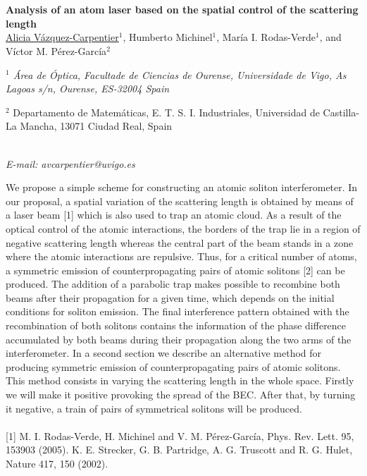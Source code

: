 \section*{}
\begin{center}
{\bf \Large
Analysis of an atom laser based on the spatial control of the scattering
length
}
\\
\vspace{0.5cm}
\underline{Alicia Vázquez-Carpentier}$^{1}$, Humberto Michinel$^{1}$, María I. Rodas-Verde$^{1}$, and Víctor M.
Pérez-García$^{2}$
\\
\vspace{0.5cm}
{\it
$^{1}$ Área de Óptica, Facultade de Ciencias de Ourense, Universidade de Vigo, As Lagoas s/n,
Ourense, ES-32004 Spain

$^{2}$ Departamento de Matemáticas, E. T. S. I. Industriales, Universidad de Castilla-La Mancha,
13071 Ciudad Real, Spain
}
\\
\vspace{0.5cm}
{\it E-mail: avcarpentier@uvigo.es}
\\
\vspace{0.5cm}
\end{center}
We propose a simple scheme for constructing an atomic soliton interferometer. In our proposal, a
spatial variation of the scattering length is obtained by means of a laser beam [1] which is also used
to trap an atomic cloud. As a result of the optical control of the atomic interactions, the borders of
the trap lie in a region of negative scattering length whereas the central part of the beam stands in
a zone where the atomic interactions are repulsive. Thus, for a critical number of atoms,
a symmetric emission of counterpropagating pairs of atomic solitons [2] can be produced. The addition
of a parabolic trap makes possible to recombine both beams after their propagation for a given
time, which depends on the initial conditions for soliton emission. The final interference pattern
obtained with the recombination of both solitons contains the information of the phase difference
accumulated by both beams during their propagation along the two arms of the interferometer.
In a second section we describe an alternative method for producing symmetric emission of
counterpropagating pairs of atomic solitons. This method consists in varying the scattering length in
the whole space. Firstly we will make it positive provoking the spread of the BEC. After that, by
turning it negative, a train of pairs of symmetrical solitons will be produced.
\\
\vspace{0.5cm}
\\
{\footnotesize
[1] M. I. Rodas-Verde, H. Michinel and V. M. Pérez-García, Phys. Rev. Lett. 95, 153903 (2005).
\newline
[2] K. E. Strecker, G. B. Partridge, A. G. Truscott and R. G. Hulet, Nature 417, 150 (2002).
}

